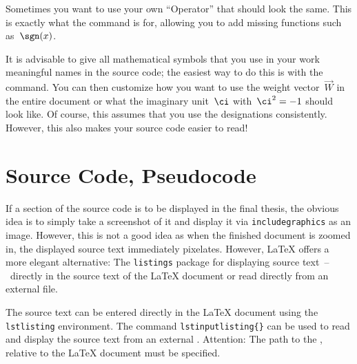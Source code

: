 Sometimes you want to use your own  \enquote{Operator} that should look the 
same. This is exactly what the  command is for, 
allowing you to add missing functions such as~$\sgn(x)$.

It is advisable to give all mathematical symbols that you use in your work
meaningful names in the source code; the easiest way to do this is with the
 command. You can then customize how you want to use the weight
vector~$\vec{W}$ in the entire document or what the imaginary unit~$\ci$ 
with~$\ci^2 = -1$ should look like. Of course, this assumes that you use the 
designations consistently. However, this also makes your source code easier to 
read!

\section{Source Code, Pseudocode}
\label{sec:listing}
%
%
If a section of the source code is to be displayed in the final thesis, the 
obvious idea is to simply take a screenshot of it and display it via  
\texttt{\tb includegraphics} as an image. However, this is not a good idea as 
when the finished document is zoomed in, the displayed source text immediately 
pixelates. However, \LaTeX{} offers a more elegant alternative: The  
\texttt{listings} package for displaying source text~--~directly in the source 
text of the \LaTeX{} document or read directly from an external file.

The source text can be entered directly in the \LaTeX{} document using the 
\texttt{lstlisting} environment. The command
\texttt{\tb lstinputlisting\{\}} can be used to read and display the 
source text from an external . Attention: The path to the 
, relative to the \LaTeX{} document must be specified.

